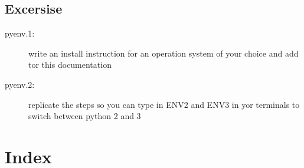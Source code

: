 \subsection{Excersise}
\label{\detokenize{lesson/prg/pyenv:excersise}}\begin{description}
\item[{pyenv.1:}] \leavevmode
write an install instruction for an operation system of your choice
and add tor this documentation

\item[{pyenv.2:}] \leavevmode
replicate the steps so you can type in ENV2 and ENV3 in yor
terminals to switch between python 2 and 3

\end{description}


\section{Index}
\label{\detokenize{notes:index}}

